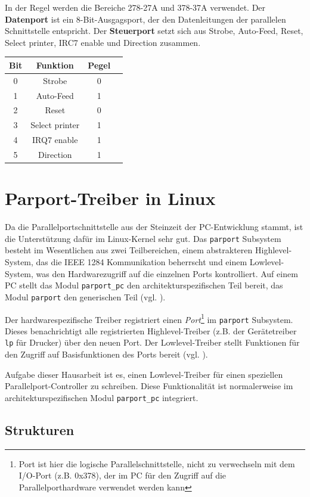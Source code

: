 \documentclass[a4paper,11pt]{article}
\begin{document}
In der Regel werden die Bereiche 278-27A und 378-37A verwendet. Der \textbf{Datenport} ist ein 8-Bit-Ausgagsport, der den Datenleitungen der parallelen Schnittstelle entspricht.  Der \textbf{Steuerport} setzt sich aus  Strobe, Auto-Feed, Reset, Select printer, IRC7 enable und Direction zusammen. 
 \begin{tabular}{|c|c|c|c|}
  \hline
Bit	&	Funktion		&	Pegel  \\ \hline
0	&	Strobe		&	0 \\ \hline
1	&	Auto-Feed		&	1\\ \hline
2	&	Reset		&	0\\ \hline
3	&	Select printer	&	1\\ \hline
4	&	IRQ7 enable	&	1\\ \hline
5	&	Direction	&	1\\ \hline
 \end{tabular} 

\section{Parport-Treiber in Linux}

Da die Parallelportschnittstelle aus der Steinzeit der PC-Entwicklung stammt, ist die Unterstützung
dafür im Linux-Kernel sehr gut. 
Das \verb|parport| Subsystem besteht im Wesentlichen aus zwei Teilbereichen, einem abstrakteren Highlevel-System, das
die IEEE 1284 Kommunikation beherrscht und einem Lowlevel-System, was den Hardwarezugriff auf die einzelnen Ports
kontrolliert. Auf einem PC stellt das Modul \verb|parport_pc| den architekturspezifischen Teil bereit, das Modul \verb|parport| 
den generischen Teil (vgl. \cite{net:1}).

Der hardwarespezifische Treiber registriert einen \emph{Port}\footnote{Port ist hier die logische Parallelschnittstelle, nicht zu verwechseln
mit dem I/O-Port (z.B. 0x378), der im PC für den Zugriff auf die Parallelporthardware verwendet werden kann} 
im \verb|parport| Subsystem. 
Dieses benachrichtigt alle registrierten Highlevel-Treiber (z.B. der Gerätetreiber \verb|lp| für Drucker) über den neuen Port. Der Lowlevel-Treiber stellt
Funktionen für den Zugriff auf Basisfunktionen des Ports bereit (vgl. \cite{net:1}).

Aufgabe dieser Hausarbeit ist es, einen Lowlevel-Treiber für einen speziellen Parallelport-Controller zu schreiben. Diese 
Funktionalität ist normalerweise im architekturspezifischen Modul \verb|parport_pc| integriert.

\subsection{Strukturen}
\end{document}
